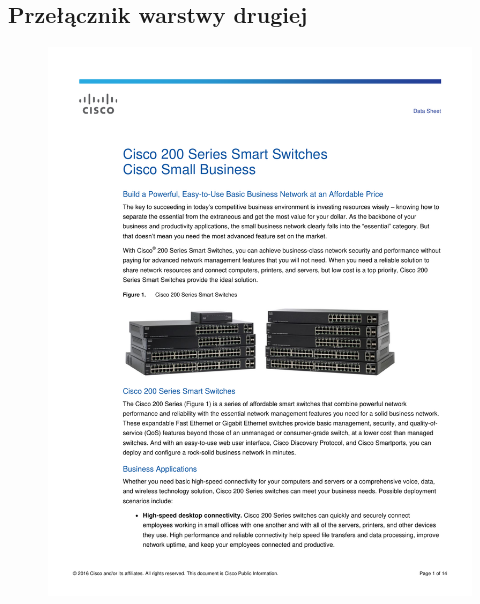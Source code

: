 \documentclass[a4paper, 12pt]{article}
\begin{document}
\subsection{Przełącznik warstwy drugiej}
\begin{figure}[H]
\centering
    \includegraphics[scale=0.80]{spec/sw2.pdf}%
    \label{fig:PropProf}
\end{figure}
\end{document}
